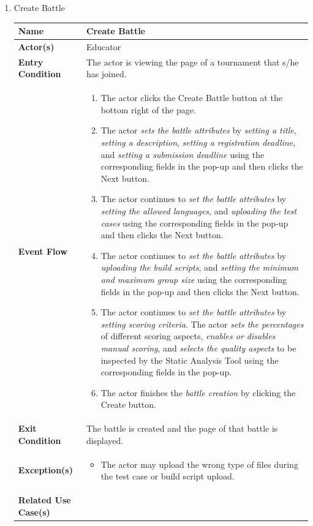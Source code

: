 \begin{enumerate}
\item Create Battle
\begin{center}
    \begin{tabular}{ | m{5em} | m{13cm}| } 
      \hline
      \textbf{Name} & Create Battle  \\ 
      \hline
      \textbf{Actor(s)} & Educator \\ 
      \hline
      \textbf{Entry Condition} & The actor is viewing the page of a tournament that s/he has joined. \\ 
      \hline
      \textbf{Event Flow} & 
          \begin{enumerate}[(1)]
              \item The actor clicks the Create Battle button at the bottom right of the page.
              \item The actor \textit{sets the battle attributes} by \textit{setting a title}, \textit{setting a description}, \textit{setting a registration deadline}, and \textit{setting a submission deadline} using the corresponding fields in the pop-up and then clicks the Next button.
              \item The actor continues to \textit{set the battle attributes} by \textit{setting the allowed languages}, and \textit{uploading the test cases} using the corresponding fields in the pop-up and then clicks the Next button.
              \item The actor continues to \textit{set the battle attributes} by \textit{uploading the build scripts}, and \textit{setting the minimum and maximum group size} using the corresponding fields in the pop-up and then clicks the Next button.
              \item The actor continues to \textit{set the battle attributes} by \textit{setting scoring criteria}. The actor \textit{sets the percentages} of different scoring aspects, \textit{enables or disables manual scoring}, and \textit{selects the quality aspects} to be inspected by the Static Analysis Tool using the corresponding fields in the pop-up.
              \item The actor finishes the \textit{battle creation} by clicking the Create button.
          \end{enumerate}
      \\ 
      \hline
      \textbf{Exit Condition} & The battle is created and the page of that battle is displayed.  \\ 
      \hline
      \textbf{Exception(s)} & 
      \begin{itemize}
          \item The actor may upload the wrong type of files during the test case or build script upload.
      \end{itemize}
          \\ 
      \hline
      \textbf{Related Use Case(s)} & 


\end{tabular}
\end{center}
\end{enumerate}
